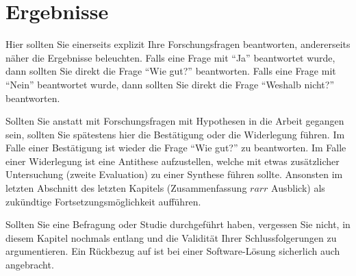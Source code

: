 \chapter{Ergebnisse}\label{chap:Results}
Hier sollten Sie einerseits explizit Ihre Forschungsfragen beantworten, andererseits näher die Ergebnisse beleuchten. Falls eine Frage mit \enquote{Ja} beantwortet wurde, dann sollten Sie direkt die Frage \enquote{Wie gut?} beantworten. Falls eine Frage mit \enquote{Nein} beantwortet wurde, dann sollten Sie direkt die Frage \enquote{Weshalb nicht?} beantworten.

Sollten Sie anstatt mit Forschungsfragen mit Hypothesen in die Arbeit gegangen sein, sollten Sie spätestens hier die Bestätigung oder die Widerlegung führen. Im Falle einer Bestätigung ist wieder die Frage \enquote{Wie gut?} zu beantworten. Im Falle einer Widerlegung ist eine Antithese aufzustellen, welche mit etwas zusätzlicher Untersuchung (zweite Evaluation) zu einer Synthese führen sollte. Ansonsten im letzten Abschnitt des letzten Kapitels (Zusammenfassung $rarr$ Ausblick) als zukündtige Fortsetzungsmöglichkeit aufführen.

Sollten Sie eine Befragung oder Studie durchgeführt haben, vergessen Sie nicht, in diesem Kapitel nochmals entlang \cite{nielsen1990} und \cite{nielsen1994} die Validität Ihrer Schlussfolgerungen zu argumentieren. Ein Rückbezug auf \cite{sommerville1992} ist bei einer Software-Lösung sicherlich auch angebracht.